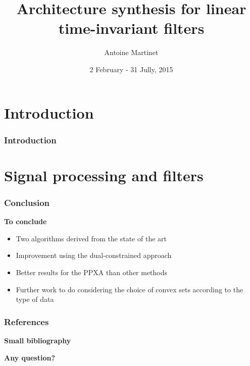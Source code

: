 \documentclass{beamer}
\title{Architecture synthesis for linear time-invariant filters}
\author{Antoine Martinet}
\date{2 February - 31 Jully, \vspace{5pt} 2015}
\begin{document}
	\begin{frame}
	\maketitle
	\end{frame}

	\section{Introduction}
	\begin{frame}
		\frametitle{Introduction}

	\end{frame}

	
	\section{Signal processing and filters}
	
	

	\begin{frame}
	\frametitle{Conclusion}
	\transdissolve
		\begin{center}
			\bfseries
			To conclude
		\end{center}
		\begin{itemize}
			\item Two algorithms derived from the state of the art
			\item Improvement using the dual-constrained approach
			\item Better results for the PPXA than other methods
			\item Further work to do considering the choice of convex sets according to the type of data
		\end{itemize}

	\end{frame}

	\begin{frame}
	\frametitle{References}
	\transdissolve
		\begin{center}
			\bfseries
			Small bibliography
		\end{center}
		\tiny
		\nocite{paper1}
		\nocite{paper2}
		
		  

	\end{frame}

	\begin{frame}
	\transboxin
		\begin{center}
			\bfseries
			Any question?
		\end{center}
	\end{frame}
\end{document}
